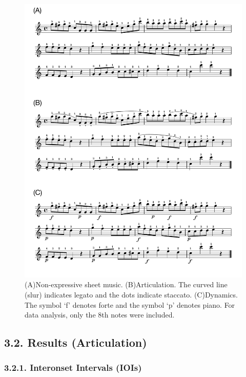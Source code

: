 \documentclass[
  english,
  man,floatsintext]{apa6}
\begin{document}
\begin{figure}
\includegraphics[width=1\linewidth]{manuscript_files/figure-latex/stim-2-1} \caption{\label{fig:stimuli-2}(A)Non-expressive sheet music. (B)Articulation. The curved line (slur) indicates legato and the dots indicate staccato. (C)Dynamics. The symbol `f' denotes forte and the symbol `p' denotes piano. For data analysis, only the 8th notes were included.}\label{fig:stim-2}
\end{figure}

\hypertarget{results-articulation-1}{%
\subsection{3.2. Results (Articulation)}\label{results-articulation-1}}

\hypertarget{interonset-intervals-iois-2}{%
\subsubsection{3.2.1. Interonset Intervals (IOIs)}\label{interonset-intervals-iois-2}}
\end{document}
